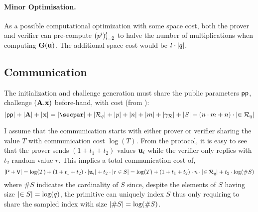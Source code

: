 \paragraph{Minor Optimisation.}

As a possible computational optimization with some space cost, both the prover and verifier can
pre-compute $(p^i)_{i=2}^{l}$ to halve the number of multiplications when computing $\vG(\vu)$.
The additional space cost would be $l \cdot \left\lvert q \right\rvert$.

\vspace{1mm}

\subsection{Communication}\label{sec:analysis:communication}

The initialization and challenge generation must share the public parameters $\pp$, challenge
$(\vA.\vx)$ before-hand, with cost (from ):
\[
	\card{\pp} + \card{\vA} + \card{\vx} =
		\card{\secpar} + \card{\Rring[\qprime]} + \card{\pprime} + \card{n}
		+ \card{m} + \card{\gamma_{\Rring}} + \card{S} +
		 \left( n\cdot m + n \right)\cdot\card{\in\Rring[\qprime]}
\]

I assume that the communication starts with either prover or verifier sharing the value $T$ with
communication cost $\log(T)$.
%
From the protocol, it is easy to see that the prover sends $(1+t_1+t_2)$ values $\vu[i]$
while the verifier only replies with $t_2$ random value $r$.
This implies a total communication cost of,
\[ \card{\prove+\verify} = \log(T) + (1+t_1+t_2)\cdot \card{\vu[i]} + t_2 \cdot \card{r \in S} =
	\log(T) + (1+t_1+t_2)\cdot n \cdot \card{\in \Rring[q]} + t_2 \cdot \log(\#{S})
\]
where $\#S$ indicates the cardinality of $S$ since, despite the elements of $S$ having size
$\left\lvert \in S \right\rvert = \log(q)$, the primitive can uniquely index $S$ thus only requiring
to share the sampled index with size $\left\lvert \#S \right\rvert = \log(\#S)$.